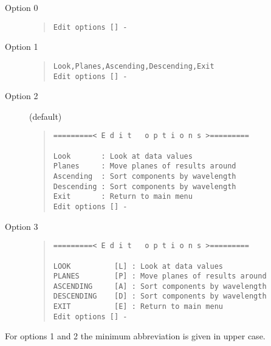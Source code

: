
\begin{description}
\item[Option 0]\mbox{}

\begin{quote}\begin{verbatim}
Edit options [] -
\end{verbatim}\end{quote}

\item[Option 1]\mbox{}

\begin{quote}\begin{verbatim}
Look,Planes,Ascending,Descending,Exit
Edit options [] -
\end{verbatim}\end{quote}

\item[Option 2] (default)

\begin{quote}\begin{verbatim}
=========< E d i t   o p t i o n s >=========

Look       : Look at data values
Planes     : Move planes of results around
Ascending  : Sort components by wavelength
Descending : Sort components by wavelength
Exit       : Return to main menu
Edit options [] -
\end{verbatim}\end{quote}

\item[Option 3]\mbox{}

\begin{quote}\begin{verbatim}
=========< E d i t   o p t i o n s >=========

LOOK          [L] : Look at data values
PLANES        [P] : Move planes of results around
ASCENDING     [A] : Sort components by wavelength
DESCENDING    [D] : Sort components by wavelength
EXIT          [E] : Return to main menu
Edit options [] -
\end{verbatim}\end{quote}

\end{description}

For options 1 and 2 the minimum abbreviation is given in upper case.

